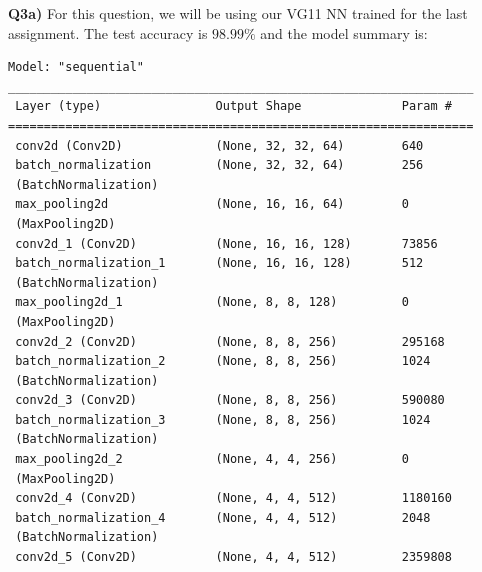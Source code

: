 \documentclass{article}
\begin{document}
\begin{titlepage}
\vspace{0.5cm}
\textbf{Q3a)} For this question, we will be using our VG11 NN trained for the last assignment. The test accuracy is $98.99\%$ and the model summary is:
\begin{lstlisting}
Model: "sequential"
_________________________________________________________________
 Layer (type)                Output Shape              Param #   
=================================================================
 conv2d (Conv2D)             (None, 32, 32, 64)        640                                  
 batch_normalization         (None, 32, 32, 64)        256       
 (BatchNormalization)                                                                                        
 max_pooling2d               (None, 16, 16, 64)        0         
 (MaxPooling2D)                                                                                                                          
 conv2d_1 (Conv2D)           (None, 16, 16, 128)       73856                                                              
 batch_normalization_1       (None, 16, 16, 128)       512       
 (BatchNormalization)                                                                                                        
 max_pooling2d_1             (None, 8, 8, 128)         0         
 (MaxPooling2D)                                                                                                                    
 conv2d_2 (Conv2D)           (None, 8, 8, 256)         295168                                                          
 batch_normalization_2       (None, 8, 8, 256)         1024      
 (BatchNormalization)                                                    
 conv2d_3 (Conv2D)           (None, 8, 8, 256)         590080                                                            
 batch_normalization_3       (None, 8, 8, 256)         1024      
 (BatchNormalization)                                                                                                 
 max_pooling2d_2             (None, 4, 4, 256)         0         
 (MaxPooling2D)                                                            
 conv2d_4 (Conv2D)           (None, 4, 4, 512)         1180160                                                        
 batch_normalization_4       (None, 4, 4, 512)         2048      
 (BatchNormalization)                                                                                                            
 conv2d_5 (Conv2D)           (None, 4, 4, 512)         2359808                                                        

\end{lstlisting}
\end{titlepage}
\end{document}
